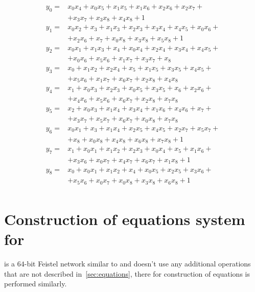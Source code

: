 \begin{equation}
    \label{eqn:misty-s9}
    \begin{array}{ll}
        y_0 =& x_0 x_4 + x_0 x_5 + x_1 x_5 + x_1 x_6 + x_2 x_6 + x_2 x_7 + \\
             & + x_3 x_7 + x_3 x_8 + x_4 x_8 + 1 \\
        y_1 =& x_0 x_2 + x_3 + x_1 x_3 + x_2 x_3 + x_3 x_4 + x_4 x_5 + x_0 x_6 + \\
             & + x_2 x_6 + x_7 + x_0 x_8 + x_3 x_8 + x_5 x_8 +1 \\
        y_2 =& x_0 x_1 + x_1 x_3 + x_4 + x_0 x_4 + x_2 x_4 + x_3 x_4 + x_4 x_5 + \\
             & + x_0 x_6 + x_5 x_6 + x_1 x_7 + x_3 x_7 + x_8 \\
        y_3 =& x_0 + x_1 x_2 + x_2 x_4 + x_5 + x_1 x_5 + x_3 x_5 + x_4 x_5 + \\
             & + x_5 x_6 + x_1 x_7 + x_6 x_7 + x_2 x_8 + x_4 x_8 \\
        y_4 =& x_1 + x_0 x_3 + x_2 x_3 + x_0 x_5 + x_3 x_5 + x_6 + x_2 x_6 + \\
             & + x_4 x_6 + x_5 x_6 + x_6 x_7 + x_2 x_8 + x_7 x_8 \\
        y_5 =& x_2 + x_0 x_3 + x_1 x_4 + x_3 x_4 + x_1 x_6 + x_4 x_6 + x_7 + \\
             & + x_3 x_7 + x_5 x_7 + x_6 x_7 + x_0 x_8 + x_7 x_8 \\
        y_6 =& x_0 x_1 + x_3 + x_1 x_4 + x_2 x_5 + x_4 x_5 + x_2 x_7 + x_5 x_7 + \\
             & + x_8 + x_0 x_8 + x_4 x_8 + x_6 x_8 + x_7 x_8 +1 \\
        y_7 =& x_1 + x_0 x_1 + x_1 x_2 + x_2 x_3 + x_0 x_4 + x_5 + x_1 x_6 + \\
             & + x_3 x_6 + x_0 x_7 + x_4 x_7 + x_6 x_7 + x_1 x_8 +1 \\
        y_8 =& x_0 + x_0 x_1 + x_1 x_2 + x_4 + x_0 x_5 + x_2 x_5 + x_3 x_6 + \\
             & + x_5 x_6 + x_0 x_7 + x_0 x_8 + x_3 x_8 + x_6 x_8 +1 \\
    \end{array}
\end{equation}


\section{Construction of equations system for \misty}

\misty is a $64$-bit Feistel network similar to \gost and doesn't use any
additional operations that are not described in~\ref{sec:equations}, there for
construction of equations is performed similarly.

